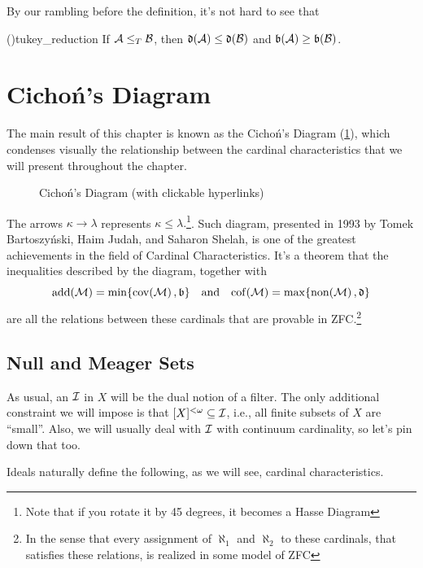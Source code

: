 By our rambling before the definition, it's not hard to see that

\begin{lemma}{(\cite{handbook})}{tukey_reduction}
    If $\mathcal{A}\leq_T\mathcal{B}$, then $\mathfrak{d}(\mathcal{A})\leq\mathfrak{d}(\mathcal{B})$ and $\mathfrak{b}(\mathcal{A})\geq\mathfrak{b}(\mathcal{B})$.
\end{lemma}

\section{Cichoń's Diagram}

The main result of this chapter is known as the Cichoń's Diagram (\cref{fig:cichons-diagram}), which condenses visually the relationship between the cardinal characteristics that we will present throughout the chapter.

\begin{figure}[ht]
\centering

\caption{Cichoń's Diagram (with clickable hyperlinks)}
\label{fig:cichons-diagram}
\end{figure}

The arrows $\kappa\to\lambda$ represents $\kappa\leq\lambda.$\footnote{Note that if you rotate it by 45 degrees, it becomes a Hasse Diagram}. Such diagram, presented in 1993 by Tomek Bartoszyński, Haim Judah, and Saharon Shelah, is one of the greatest achievements in the field of Cardinal Characteristics. It's a theorem that the inequalities described by the diagram, together with
$$\mathrm{add}\!\left(\mathcal{M}\right)=\min\{\mathrm{cov}\!\left(\mathcal{M}\right),\mathfrak{b}\}\quad\text{and}\quad\mathrm{cof}\!\left(\mathcal{M}\right)=\max\{\mathrm{non}\!\left(\mathcal{M}\right),\mathfrak{d}\}$$
are all the relations between these cardinals that are provable in ZFC.\footnote{In the sense that every assignment of $\aleph_1$ and $\aleph_2$ to these cardinals, that satisfies these relations, is realized in some model of ZFC}

\subsection{Null and Meager Sets}

As usual, an  $\mathcal{I}$ in $X$ will be the dual notion of a filter. The only additional constraint we will impose is that $[X]^{<\omega}\subseteq\mathcal{I}$, i.e., all finite subsets of $X$ are ``small''. Also, we will usually deal with $\mathcal{I}$ with continuum cardinality, so let's pin down that too.

Ideals naturally define the following, as we will see, cardinal characteristics.

